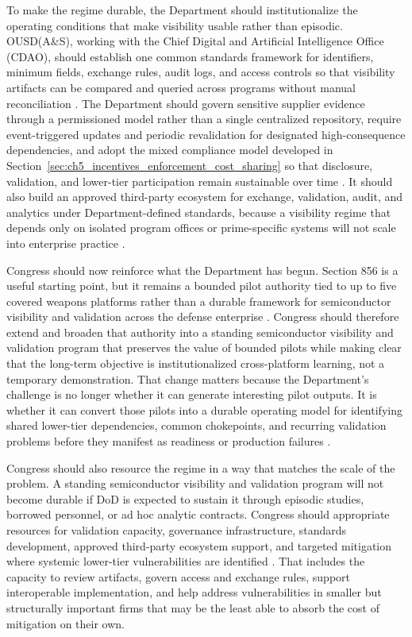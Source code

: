 To make the regime durable, the Department should institutionalize the operating conditions that make visibility usable rather than episodic. OUSD(A\&S), working with the Chief Digital and Artificial Intelligence Office (CDAO), should establish one common standards framework for identifiers, minimum fields, exchange rules, audit logs, and access controls so that visibility artifacts can be compared and queried across programs without manual reconciliation \parencite{ch5_nist800161r1upd1,ch5_dbb2025_illumination}. The Department should govern sensitive supplier evidence through a permissioned model rather than a single centralized repository, require event-triggered updates and periodic revalidation for designated high-consequence dependencies, and adopt the mixed compliance model developed in Section~\ref{sec:ch5_incentives_enforcement_cost_sharing} so that disclosure, validation, and lower-tier participation remain sustainable over time \parencite{ch5_dod2022_supplychains,ch5_nist800161r1upd1}. It should also build an approved third-party ecosystem for exchange, validation, audit, and analytics under Department-defined standards, because a visibility regime that depends only on isolated program offices or prime-specific systems will not scale into enterprise practice \parencite{ch5_nist_ir_8419,ch5_dbb2025_illumination}.

Congress should now reinforce what the Department has begun. Section 856 is a useful starting point, but it remains a bounded pilot authority tied to up to five covered weapons platforms rather than a durable framework for semiconductor visibility and validation across the defense enterprise \parencite{ch5_ndaa2024_sec856}. Congress should therefore extend and broaden that authority into a standing semiconductor visibility and validation program that preserves the value of bounded pilots while making clear that the long-term objective is institutionalized cross-platform learning, not a temporary demonstration. That change matters because the Department's challenge is no longer whether it can generate interesting pilot outputs. It is whether it can convert those pilots into a durable operating model for identifying shared lower-tier dependencies, common chokepoints, and recurring validation problems before they manifest as readiness or production failures \parencite{U.S.GovernmentAccountabilityOffice2025,ch5_dbb2025_illumination}.

Congress should also resource the regime in a way that matches the scale of the problem. A standing semiconductor visibility and validation program will not become durable if DoD is expected to sustain it through episodic studies, borrowed personnel, or ad hoc analytic contracts. Congress should appropriate resources for validation capacity, governance infrastructure, standards development, approved third-party ecosystem support, and targeted mitigation where systemic lower-tier vulnerabilities are identified \parencite{ch5_dod2022_supplychains,ch5_nist800161r1upd1}. That includes the capacity to review artifacts, govern access and exchange rules, support interoperable implementation, and help address vulnerabilities in smaller but structurally important firms that may be the least able to absorb the cost of mitigation on their own.

